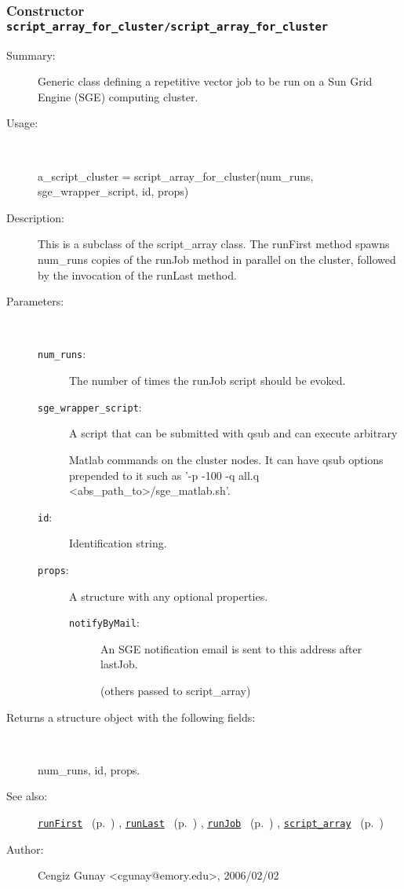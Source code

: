 \subsubsection[Constructor \texttt{script\_array\_for\_cluster}]{Constructor \texttt{script\_array\_for\_cluster/script\_array\_for\_cluster}}%
%
\label{ref_script_array_for_cluster__script_array_for_cluster}%
\hypertarget{ref_script_array_for_cluster__script_array_for_cluster}{}%
\begin{description}
\item[Summary:]Generic class defining a repetitive vector job to be run on a Sun Grid Engine (SGE) computing cluster.
%
\item[Usage:]~%
\begin{lyxcode}%
a\_script\_cluster = script\_array\_for\_cluster(num\_runs, sge\_wrapper\_script, id, props)
%
\end{lyxcode}%
%
\item[Description:]%
This is a subclass of the script\_array class. The runFirst method spawns num\_runs
 copies of the runJob method in parallel on the cluster, followed by the invocation 
 of the runLast method.
\item[Parameters:]~
\begin{description}%
\item[\texttt{num\_runs}:]
 The number of times the runJob script should be evoked.
\item[\texttt{sge\_wrapper\_script}:]
 A script that can be submitted with qsub and can execute arbitrary

Matlab commands on the cluster nodes. It can have qsub options prepended to it
such as '-p -100 -q all.q <abs\_path\_to>/sge\_matlab.sh'.\item[\texttt{id}:]
 Identification string.
\item[\texttt{props}:]
 A structure with any optional properties.
\begin{description}%
\item[\texttt{notifyByMail}:]
 An SGE notification email is sent to this address after lastJob.

(others passed to script\_array)\end{description}%
\end{description}%
%
\item[Returns a structure object with the following fields:]~

	num\_runs, id, props.
%
%
\item[See also:]%
\hyperlink{ref_runFirst}{\texttt{runFirst}}%
\ (p.~\pageref{ref_runFirst})%
%
, \hyperlink{ref_runLast}{\texttt{runLast}}%
\ (p.~\pageref{ref_runLast})%
%
, \hyperlink{ref_runJob}{\texttt{runJob}}%
\ (p.~\pageref{ref_runJob})%
%
, \hyperlink{ref_script_array}{\texttt{script\_array}}%
\ (p.~\pageref{ref_script_array})%
%
%
\item[Author:]%
Cengiz Gunay <cgunay@emory.edu>, 2006/02/02%
\end{description}
\methodline%
